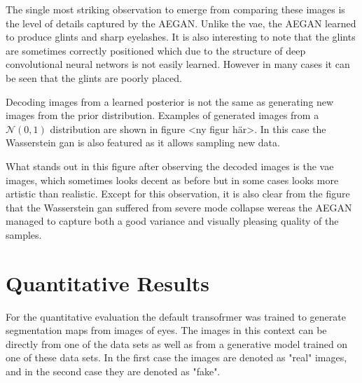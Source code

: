 The single most striking observation to emerge from comparing these images is the level of details captured by the AEGAN. Unlike the \acrshort{vae}, the AEGAN learned to produce glints and sharp eyelashes. It is also interesting to note that the glints are sometimes correctly positioned which due to the structure of deep convolutional neural networs is not easily learned. However in many cases it can be seen that the glints are poorly placed.

Decoding images from a learned posterior is not the same as generating new images from the prior distribution. Examples of generated images from a $\mathcal{N}(0, 1)$ distribution are shown in figure <ny figur här>. In this case the Wasserstein \acrshort{gan} is also featured as it allows sampling new data. 

What stands out in this figure after observing the decoded images is the \acrshort{vae} images, which sometimes looks decent as before but in some cases looks more artistic than realistic. Except for this observation, it is also clear from the figure that the Wasserstein \acrshort{gan} suffered from severe mode collapse wereas the AEGAN managed to capture both a good variance and visually pleasing quality of the samples.




\section{Quantitative Results}
For the quantitative evaluation the default transofrmer was trained to generate segmentation maps from images of eyes. The images in this context can be directly from one of the data sets as well as from a generative model trained on one of these data sets. In the first case the images are denoted as "real" images, and in the second case they are denoted as "fake". 

